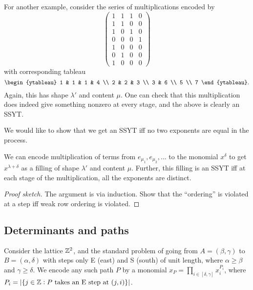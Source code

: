 \begin{fex}
		For another example, consider the series of multiplications encoded by
		\[
		\begin{pmatrix}
			1 & 1 & 1 & 0 \\
			1 & 1 & 0 & 0 \\
			1 & 0 & 1 & 0 \\
			0 & 0 & 0 & 1 \\
			1 & 0 & 0 & 0 \\
			0 & 1 & 0 & 0 \\
			1 & 0 & 0 & 0
		\end{pmatrix}
		\]
		with corresponding tableau
		\[
		\begin{ytableau}
			1 & 1 & 1 & 4 \\ 2 & 2 & 3 \\ 3 & 6 \\ 5 \\ 7
		\end{ytableau}.
		\]
		Again, this has shape $\lambda'$ and content $\mu$. One can check that this multiplication does indeed give something nonzero at every stage, and the above is clearly an SSYT.
	\end{fex}

	We would like to show that we get an SSYT iff no two exponents are equal in the process.

	\begin{flem}
		We can encode multiplication of terms from $e_{\mu_1},e_{\mu_2},\ldots$ to the monomial $x^\delta$ to get $x^{\lambda+\delta}$ as a filling of shape $\lambda'$ and content $\mu$. Further, this filling is an SSYT iff at each stage of the multiplication, all the exponents are distinct.
	\end{flem}
	\begin{proof}[Proof sketch]
		The argument is via induction. Show that the ``ordering'' is violated at a step iff weak row ordering is violated.
	\end{proof}

\subsection{Determinants and paths}

	Consider the lattice $\mathbb{Z}^2$, and the standard problem of going from $A = (\beta,\gamma)$ to $B = (\alpha,\delta)$ with steps only E (east) and S (south) of unit length, where $\alpha \ge \beta$ and $\gamma \ge \delta$. We encode any such path $P$ by a monomial $x_P = \prod_{i \in [\delta,\gamma]} x_i^{P_i}$, where $P_i = |\{ j \in \mathbb{Z} : \text{$P$ takes an E step at $(j,i)$} \}|$.\\

